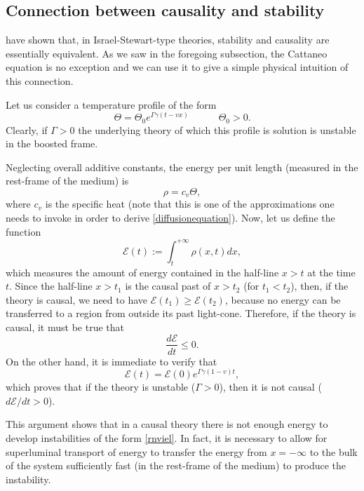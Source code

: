 \documentclass[a4paper, amsfonts, amssymb, amsmath, reprint, showkeys, nofootinbib, twoside]{revtex4-1}
\newcommand{\spc}{\quad \quad \quad}
\begin{document}
\subsection{Connection between causality and stability}

\citet{Hishcock1983,Olson1990} have shown that, in Israel-Stewart-type theories, stability and causality are essentially equivalent. As we saw in the foregoing subsection, the Cattaneo equation is no exception and we can use it to give a simple physical intuition of this connection.

Let us consider a temperature profile of the form
\begin{equation}\label{rnviel}
\Theta = \Theta_0 e^{\Gamma\gamma (t-vx)} \spc \Theta_0>0.
\end{equation} 
Clearly, if $\Gamma>0$ the underlying theory of which this profile is solution is unstable in the boosted frame. 

Neglecting overall additive constants, the energy per unit length (measured in the rest-frame of the medium) is
\begin{equation}
\rho = c_v \Theta,
\end{equation}
where $c_v$ is the specific heat (note that this is one of the approximations one needs to invoke in order to derive \eqref{diffusionequation}). Now, let us define the function
\begin{equation}
\mathcal{E}(t) := \int_t ^{+\infty} \rho(x,t) dx,
\end{equation}
which measures the amount of energy contained in the half-line $x>t$ at the time $t$. Since the half-line $x>t_1$ is the causal past of $x>t_2$ (for $t_1 < t_2$), then, if the theory is causal, we need to have $\mathcal{E}(t_1) \geq \mathcal{E}(t_2)$, because no energy can be transferred to a region from outside its past light-cone. 
Therefore, if the theory is causal, it must be true that
\begin{equation}
\dfrac{d \mathcal{E}}{dt} \leq 0.
\end{equation} 
On the other hand, it is immediate to verify that
\begin{equation}
\mathcal{E}(t) = \mathcal{E}(0) e^{\Gamma \gamma(1-v) t},
\end{equation}
which proves that if the theory is unstable ($\Gamma>0$), then it is not causal ($d\mathcal{E}/dt>0$).

This argument shows that in a causal theory there is not enough energy to develop instabilities of the form \eqref{rnviel}. In fact, it is necessary to allow for superluminal transport of energy to transfer the energy from $x=-\infty$ to the bulk of the system sufficiently fast (in the rest-frame of the medium) to produce the instability.

%
%






\label{lastpage}
\end{document}

